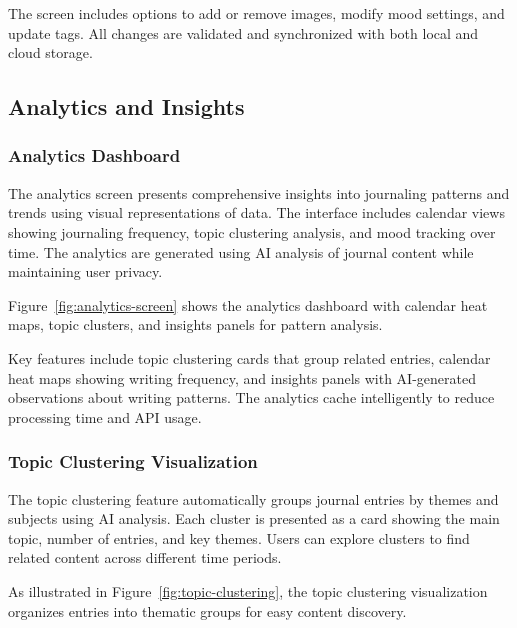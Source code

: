 The screen includes options to add or remove images, modify mood settings, and update tags. All changes are validated and synchronized with both local and cloud storage.

\subsection{Analytics and Insights}

\subsubsection{Analytics Dashboard}

The analytics screen presents comprehensive insights into journaling patterns and trends using visual representations of data. The interface includes calendar views showing journaling frequency, topic clustering analysis, and mood tracking over time. The analytics are generated using AI analysis of journal content while maintaining user privacy.

Figure~\ref{fig:analytics-screen} shows the analytics dashboard with calendar heat maps, topic clusters, and insights panels for pattern analysis.


Key features include topic clustering cards that group related entries, calendar heat maps showing writing frequency, and insights panels with AI-generated observations about writing patterns. The analytics cache intelligently to reduce processing time and API usage.

\subsubsection{Topic Clustering Visualization}

The topic clustering feature automatically groups journal entries by themes and subjects using AI analysis. Each cluster is presented as a card showing the main topic, number of entries, and key themes. Users can explore clusters to find related content across different time periods.

As illustrated in Figure~\ref{fig:topic-clustering}, the topic clustering visualization organizes entries into thematic groups for easy content discovery.

